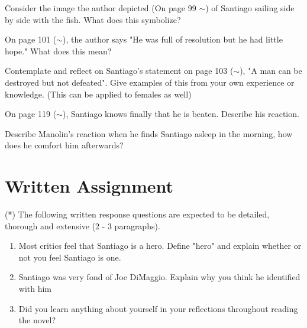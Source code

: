 \documentclass[12pt]{article} %
\begin{document}
\begin{qstn}
  Consider the image the author depicted (On page 99 $\sim$) of Santiago sailing side by side with the fish. What does this symbolize?
\end{qstn}

\begin{qstn}
  On page 101 ($\sim$), the author says "He was full of resolution but he had little hope." What does this mean?
\end{qstn}

\begin{qstn}
  Contemplate and reflect on Santiago's statement on page 103 ($\sim$), "A man can be destroyed but not defeated". Give examples of this from your own experience
  or knowledge. (This can be applied to females as well)
\end{qstn}

\begin{qstn}
  On page 119 ($\sim$), Santiago knows finally that he is beaten. Describe his reaction.
\end{qstn}

\begin{qstn}
  Describe Manolin's reaction when he finds Santiago asleep in the morning, how does he comfort him afterwards?
\end{qstn}

\section*{Written Assignment}
(*) The following written response questions are expected to be detailed, thorough and extensive (2 - 3 paragraphs).
\begin{enumerate}
  \item Most critics feel that Santiago is a hero. Define "hero" and explain whether or not you feel Santiago is one.
  \item Santiago was very fond of Joe DiMaggio. Explain why you think he identified with him
  \item Did you learn anything about yourself in your reflections throughout reading the novel?
\end{enumerate}
\end{document}
